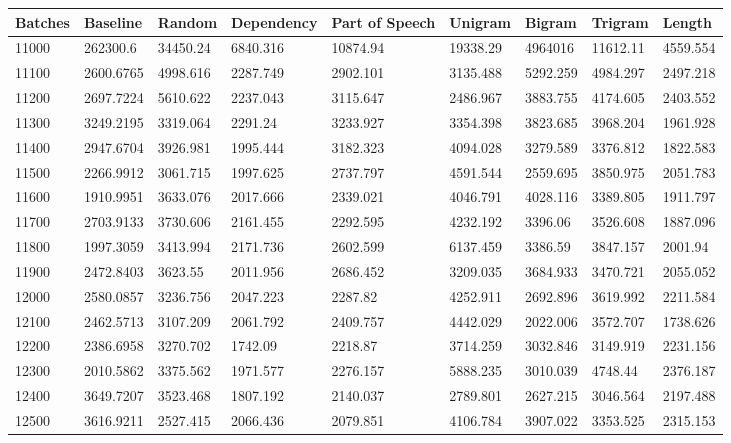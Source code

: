 \documentclass [11pt, proquest] {uwthesis}[2020/12/20]
\begin{document}
\begin{table}[]
\centering
\begin{tiny}
\begin{tabular}{|l|l|l|l|l|l|l|l|l|}
\hline
Batches & Baseline & Random & Dependency & Part of Speech & Unigram & Bigram & Trigram & Length \\ \hline
11000 & 262300.6 & 34450.24 & 6840.316 & 10874.94 & 19338.29 & 4964016 & 11612.11 & 4559.554 \\\hline
11100 & 2600.6765 & 4998.616 & 2287.749 & 2902.101 & 3135.488 & 5292.259 & 4984.297 & 2497.218 \\ \hline
11200 & 2697.7224 & 5610.622 & 2237.043 & 3115.647 & 2486.967 & 3883.755 & 4174.605 & 2403.552 \\ \hline
11300 & 3249.2195 & 3319.064 & 2291.24 & 3233.927 & 3354.398 & 3823.685 & 3968.204 & 1961.928 \\ \hline
11400 & 2947.6704 & 3926.981 & 1995.444 & 3182.323 & 4094.028 & 3279.589 & 3376.812 & 1822.583 \\ \hline
11500 & 2266.9912 & 3061.715 & 1997.625 & 2737.797 & 4591.544 & 2559.695 & 3850.975 & 2051.783 \\ \hline
11600 & 1910.9951 & 3633.076 & 2017.666 & 2339.021 & 4046.791 & 4028.116 & 3389.805 & 1911.797 \\ \hline
11700 & 2703.9133 & 3730.606 & 2161.455 & 2292.595 & 4232.192 & 3396.06 & 3526.608 & 1887.096 \\ \hline
11800 & 1997.3059 & 3413.994 & 2171.736 & 2602.599 & 6137.459 & 3386.59 & 3847.157 & 2001.94 \\ \hline
11900 & 2472.8403 & 3623.55 & 2011.956 & 2686.452 & 3209.035 & 3684.933 & 3470.721 & 2055.052 \\  \hline
12000 & 2580.0857 & 3236.756 & 2047.223 & 2287.82 & 4252.911 & 2692.896 & 3619.992 & 2211.584 \\ \hline
12100 & 2462.5713 & 3107.209 & 2061.792 & 2409.757 & 4442.029 & 2022.006 & 3572.707 & 1738.626 \\ \hline
12200 & 2386.6958 & 3270.702 & 1742.09 & 2218.87 & 3714.259 & 3032.846 & 3149.919 & 2231.156 \\ \hline
12300 & 2010.5862 & 3375.562 & 1971.577 & 2276.157 & 5888.235 & 3010.039 & 4748.44 & 2376.187 \\ \hline
12400 & 3649.7207 & 3523.468 & 1807.192 & 2140.037 & 2789.801 & 2627.215 & 3046.564 & 2197.488 \\ \hline
12500 & 3616.9211 & 2527.415 & 2066.436 & 2079.851 & 4106.784 & 3907.022 & 3353.525 & 2315.153 \\ \hline

\end{tabular}
\end{tiny}
\end{table}
\end{document}
